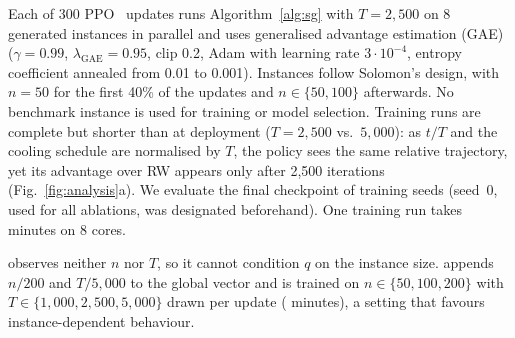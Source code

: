 

Each of 300 PPO~\cite{schulman2017ppo} updates runs Algorithm~\ref{alg:sg} with
$T=2{,}500$ on 8 generated instances in parallel and uses generalised advantage
estimation (GAE)~\cite{schulman2016gae} ($\gamma=0.99$, $\lambda_{\mathrm{GAE}}=0.95$,
clip 0.2, Adam with learning rate $3\cdot10^{-4}$, entropy coefficient annealed from
0.01 to 0.001). Instances follow Solomon's design, with $n=50$ for the first 40\% of
the updates and $n\in\{50,100\}$ afterwards. No benchmark instance is used for training
or model selection. Training runs are complete but shorter than at deployment
($T=2{,}500$ vs.\ $5{,}000$): as $t/T$ and the cooling schedule are normalised by $T$, the
policy sees the same relative trajectory, yet its advantage over RW appears only after
2{,}500 iterations (Fig.~\ref{fig:analysis}a). We evaluate the final checkpoint of
\rseedN{} training seeds (seed~0,
used for all ablations, was designated beforehand). One training run takes \tTrainMin{}
minutes on 8 cores.

\sgalns{} observes neither $n$ nor $T$, so it cannot condition $q$ on the instance size.
\sgc{} appends $n/200$ and $T/5{,}000$ to the global vector and is trained on
$n\in\{50,100,200\}$ with $T\in\{1{,}000,2{,}500,5{,}000\}$ drawn per update
(\tCtxMin{} minutes), a setting that favours instance-dependent behaviour.
